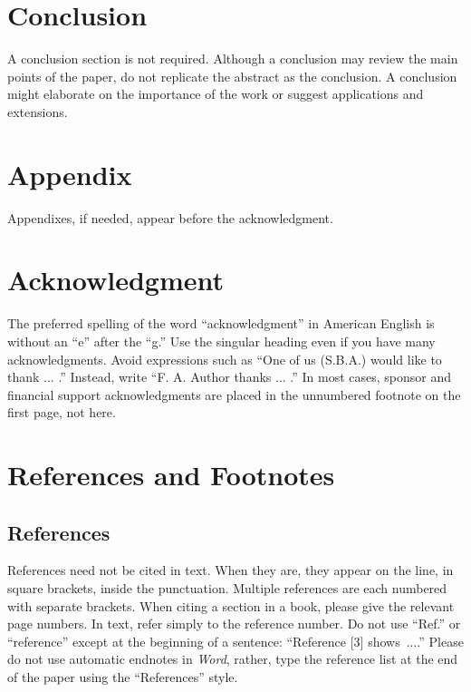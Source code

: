 \documentclass[journal]{IEEEtai}
\begin{document}
\section{Conclusion}

A conclusion section is not required. Although a conclusion may review the main points of the paper, do not replicate the abstract as the conclusion. A conclusion might elaborate on the importance of the work or suggest applications and extensions.

\section*{Appendix}

Appendixes, if needed, appear before the acknowledgment.

\section*{Acknowledgment}

The preferred spelling of the word ``acknowledgment'' in American English is without an ``e'' after the ``g.'' Use the singular heading even if you have many acknowledgments. Avoid expressions such as ``One of us (S.B.A.) would like to thank ... .'' Instead, write ``F. A. Author thanks ... .'' In most cases, sponsor and financial support acknowledgments are placed in the unnumbered footnote on the first page, not here.

\section*{References and Footnotes}

\subsection{References}

References need not be cited in text. When they are, they appear on the line, in square brackets, inside the punctuation. Multiple references are each numbered with separate brackets. When citing a section in a book, please give the relevant page numbers. In text, refer simply to the reference number. Do not use ``Ref.'' or ``reference'' except at the beginning of a sentence: ``Reference [3] shows~....'' Please do not use automatic endnotes in {\it Word}, rather, type the reference list at the end of the paper using the ``References''  style.
\end{document}
